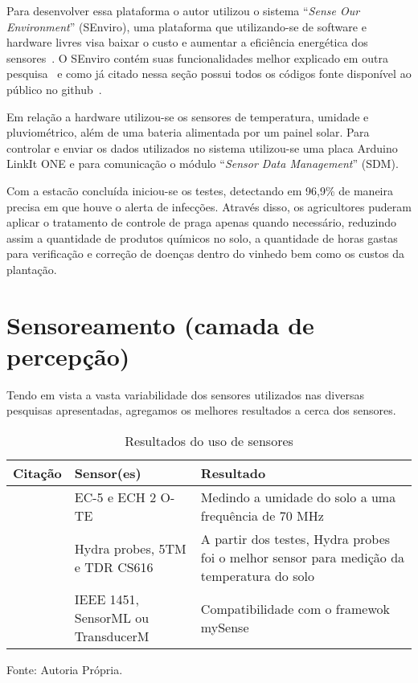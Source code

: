 \documentclass[
article,			%
12pt,				%
oneside,			%
a4paper,			%
english,			%
brazil,				%
sumario=tradicional
]{abntex2}
\begin{document}
Para desenvolver essa plataforma o autor utilizou o sistema ``\textit{Sense Our Environment}'' (SEnviro), uma plataforma que utilizando-se de software e hardware livres visa baixar o custo e aumentar a eficiência energética dos sensores~\cite{2}. O SEnviro contém suas funcionalidades melhor explicado em outra pesquisa~\cite{SEnviro} e como já citado nessa seção possui todos os códigos fonte disponível ao público no github~\cite{SEnviro_Github}.

Em relação a hardware utilizou-se os sensores de temperatura, umidade e pluviométrico, além de uma bateria alimentada por um painel solar. Para controlar e enviar os dados utilizados no sistema utilizou-se uma placa Arduino LinkIt ONE e para comunicação o módulo ``\textit{Sensor Data Management}'' (SDM).

Com a estacão concluída iniciou-se os testes, detectando em 96,9\% de maneira precisa em que houve o alerta de infecções. Através disso, os agricultores puderam aplicar o tratamento de controle de praga apenas quando necessário, reduzindo assim a quantidade de produtos químicos no solo, a quantidade de horas gastas para verificação e correção de doenças dentro do vinhedo bem como os custos da plantação.

\section{Sensoreamento (camada de percepção)}\label{Sensoreamento do solo (camada de percepção)}

Tendo em vista a vasta variabilidade dos sensores utilizados nas diversas pesquisas apresentadas, agregamos os melhores resultados a cerca dos sensores.

\clearpage
\begin{table}[!htb]
  \centering
  \caption{Resultados do uso de sensores}
  \begin{tabular}{|p{4.2cm}|p{4.2cm}|p{4.2cm}|}
    \hline
    \textbf{Citação} & \textbf{Sensor(es)}& \textbf{Resultado} \\ \hline
    \cite{3} & EC-5 e ECH 2 O-TE & Medindo a umidade do solo a uma frequência de 70 MHz \\ \hline
    \cite{12} & Hydra probes, 5TM e TDR CS616 & A partir dos testes, Hydra probes foi o melhor sensor para medição da temperatura do solo\\ \hline
    \cite{7} & IEEE 1451, SensorML ou TransducerM & Compatibilidade com o framewok mySense \\ \hline
  \end{tabular}

  {Fonte: Autoria Própria.}
\end{table}
\end{document}
